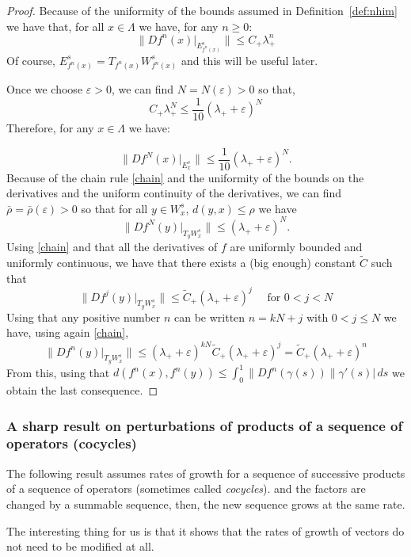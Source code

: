 \documentclass[11pt]{amsart}
\theoremstyle{definition}
\theoremstyle{remark}
\numberwithin{equation}{section}
\newcommand{\eps}{\varepsilon}
\begin{document}
\begin{proof}
Because of the uniformity of the bounds assumed in Definition~\ref{def:nhim} we have that, for all $x\in \Lambda$ we have, for any $n\ge 0$:
\[
\|Df^n (x)|_{E^s_{f^n(x)}} \| \le C_+ \lambda_+^n
\]
Of course, $E^s_{f^n(x)} = T_{f^n(x)} W^s_{f^n(x)}$ and this will be useful later.

Once we choose $\eps > 0 $, we can find $N= N(\eps) > 0 $ so
that,
\[
 C_+ \lambda_+^N \le \frac{1}{10} (\lambda_+ + \eps)^N
\]
Therefore, for any $x\in \Lambda$ we have:

\[
\| Df^N (x)|_{E^s_x} \| \le \frac{1}{10} (\lambda_+ + \eps)^N .
\]
Because of the chain rule \eqref{chain} and the uniformity
of the bounds on the derivatives and the uniform continuity of
the derivatives, we can find $\bar \rho =\bar \rho (\eps) > 0$ so
that for all $y \in W^s_x$, $d(y, x) \le \rho$ we have
\[
\| Df^N (y)|_{T_y W^s_x } \| \le  (\lambda_+ + \eps)^N .
\]
Using \eqref{chain} and that all the derivatives of $f$ are uniformly bounded and uniformly continuous, we have
that there exists a (big enough) constant $ \tilde C$ such that
\[
\| Df^j (y)|_{T_y W^s_x } \| \le \tilde C_{+} (\lambda_+ + \eps)^j \quad \textrm { for }0< j < N
\]
Using that any positive number $n$ can be written $n = k N +j $ with $0 < j \le  N$ we have, using again \eqref{chain},
\[
\| Df^n (y)|_{T_y W^s_x } \| \le (\lambda_+ + \eps)^{kN} \tilde C_{+} (\lambda_+ + \eps)^j  =\tilde C_+ (\lambda_+ +\eps)^n
\]
    From this, using that
    $d(f^n(x), f^n(y)) \le \int_0^1  \|Df^n(\gamma(s)) \| \gamma'(s)| \, d s$
    we obtain  the last consequence.
   \end{proof}




\subsubsection{A sharp result on perturbations of products
  of a sequence of operators (cocycles)}
\label{sec:sharpperturbation}

The following result assumes rates of growth for a sequence
of successive products  of a sequence of
operators (sometimes called \emph{cocycles}).
and the factors are changed by a summable sequence, then, the
new sequence grows at the same rate.

The interesting thing for us is that it shows that the
rates of growth of vectors do not need to be modified at all.
\end{document}
